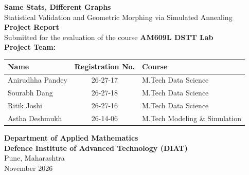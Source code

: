 \documentclass[12pt, a4paper]{article}
\begin{document}
\begin{titlepage}
    \begin{center}
        \vspace*{1cm}
        \Huge \textbf{Same Stats, Different Graphs} \\
        \vspace{0.5cm}
        \LARGE Statistical Validation and Geometric Morphing via Simulated Annealing \\
        \vspace{1.5cm}
        \Large \textbf{Project Report} \\
        \vspace{0.5cm}
        \normalsize Submitted for the evaluation of the course \textbf{AM609L DSTT Lab} \\
        \vspace{1.5cm}
        \textbf{Project Team:} \\
        \vspace{0.5cm}
        \begin{table}[h!]
        \centering
        \large
        \renewcommand{\arraystretch}{1.5}
        \begin{tabular}{|l|c|l|}
        \hline
        \textbf{Name} & \textbf{Registration No.} & \textbf{Course} \\ \hline
        Anirudhha Pandey & 26-27-17 & M.Tech Data Science \\ \hline
        Sourabh Dang & 26-27-18 & M.Tech Data Science \\ \hline
        Ritik Joshi & 26-27-16 & M.Tech Data Science \\ \hline
        Astha Deshmukh & 26-14-06 & M.Tech Modeling \& Simulation \\ \hline
        \end{tabular}
        \end{table}
        \vfill
        \Large \textbf{Department of Applied Mathematics}\\
        \textbf{Defence Institute of Advanced Technology (DIAT)}\\
        Pune, Maharashtra\\
        \vspace{0.5cm}
        November 2026
    \end{center}
\end{titlepage}

\newpage
\end{document}
